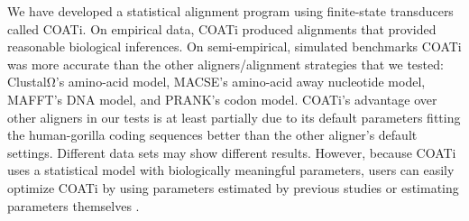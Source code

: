 \documentclass[12pt,letterpaper]{article}
\begin{document}


We have developed a statistical alignment program using finite-state transducers called COATi. On empirical data, COATi produced alignments that provided reasonable biological inferences. On semi-empirical, simulated benchmarks COATi was more accurate than the other aligners/alignment strategies that we tested: ClustalΩ's amino-acid model, MACSE's amino-acid away nucleotide model, MAFFT's DNA model, and PRANK's codon model. COATi's advantage over other aligners in our tests is at least partially due to its default parameters fitting the human-gorilla coding sequences better than the other aligner's default settings. Different data sets may show different results. However, because COATi uses a statistical model with biologically meaningful parameters, users can easily optimize COATi by using parameters estimated by previous studies or estimating parameters themselves \citep[e.g.][]{zhu2022profiling}.
\end{document}
